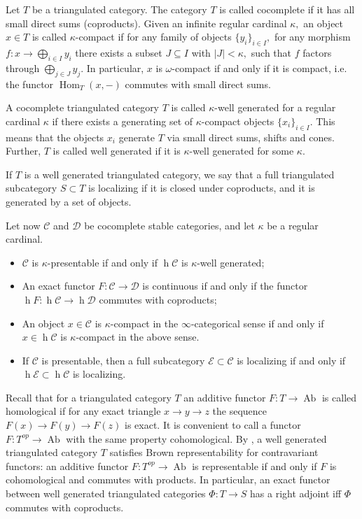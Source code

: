 \documentclass[11pt,leqno]{amsart}
\numberwithin{equation}{section}
\def\h{\operatorname{h}}
\def\Hom{\operatorname{Hom}}
\newcommand{\cD}{{\mathcal D}}
\newcommand{\cC}{{\mathcal C}}
\newcommand{\cE}{{\mathcal E}}
\newcommand{\Ab}{\operatorname{Ab}}
\begin{document}
Let $T$ be a triangulated category. The category $T$ is called cocomplete if it has all small direct sums (coproducts). Given an infinite regular cardinal $\kappa,$ an object $x\in T$ is called $\kappa$-compact if for any family of objects $\{y_i\}_{i\in I},$ for any morphism $f:x\to\bigoplus\limits_{i\in I}y_i$ there exists a subset $J\subseteq I$ with $|J|<\kappa,$ such that $f$ factors through $\bigoplus\limits_{j\in J}y_j.$ In particular, $x$ is $\omega$-compact if and only if it is compact, i.e. the functor $\Hom_T(x,-)$ commutes with small direct sums.

A cocomplete triangulated category $T$ is called $\kappa$-well generated for a regular cardinal $\kappa$ if there exists a generating set of $\kappa$-compact objects $\{x_i\}_{i\in I}.$ This means that the objects $x_i$ generate $T$ via small direct sums, shifts and cones. Further, $T$ is called well generated if it is $\kappa$-well generated for some $\kappa.$

If $T$ is a well generated triangulated category, we say that a full triangulated subcategory $S\subset T$ is localizing if it is closed under coproducts, and it is generated by a set of objects.

Let now $\cC$ and $\cD$ be cocomplete stable categories, and let $\kappa$ be a regular cardinal.

\begin{itemize}
\item $\cC$ is $\kappa$-presentable if and only if $\h\cC$ is $\kappa$-well generated;

\item An exact functor $F:\cC\to\cD$ is continuous if and only if the functor $\h F:\h\cC\to\h\cD$ commutes with coproducts;

\item An object $x\in\cC$ is $\kappa$-compact in the $\infty$-categorical sense if and only if $x\in \h\cC$ is $\kappa$-compact in the above sense.

\item If $\cC$ is presentable, then a full subcategory $\cE\subset\cC$ is localizing if and only if $\h\cE\subset\h\cC$ is localizing. 
\end{itemize}

Recall that for a triangulated category $T$ an additive functor $F:T\to\Ab$ is called homological if for any exact triangle $x\to y\to z$ the sequence $F(x)\to F(y)\to F(z)$ is exact. It is convenient to call a functor $F:T^{op}\to\Ab$ with the same property cohomological. By \cite[Theorem 1.17]{Nee01}, a well generated triangulated category $T$ satisfies Brown representability for contravariant functors: an additive functor $F:T^{op}\to\Ab$ is representable if and only if $F$ is cohomological and commutes with products. In particular, an exact functor between well generated triangulated categories $\Phi:T\to S$ has a right adjoint iff $\Phi$ commutes with coproducts. 
\end{document}
